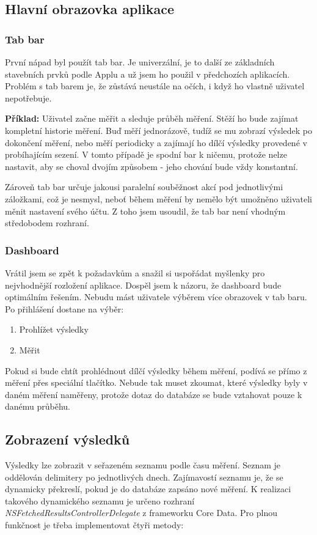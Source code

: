 \subsection*{Hlavní obrazovka aplikace}

\subsubsection*{Tab bar}
První nápad byl použít tab bar. Je univerzální, je to další ze základních stavebních prvků podle Applu a už jsem ho použil v předchozích aplikacích. Problém s tab barem je, že zůstává neustále na očích, i když ho vlastně uživatel nepotřebuje. 

{\bf Příklad:}
Uživatel začne měřit a sleduje průběh měření. Stěží ho bude zajímat kompletní historie měření. Buď měří jednorázově, tudíž se mu zobrazí výsledek po dokončení měření, nebo měří periodicky a zajímají ho dílčí výsledky provedené v probíhajícím sezení. V tomto případě je spodní bar k ničemu, protože nelze nastavit, aby se choval dvojím způsobem - jeho chování bude vždy konstantní.

Zároveň tab bar určuje jakousi paralelní souběžnost akcí pod jednotlivými záložkami, což je nesmysl, neboť během měření by nemělo být umožněno uživateli měnit nastavení svého účtu. Z toho jsem usoudil, že tab bar není vhodným středobodem rozhraní.

\subsubsection*{Dashboard}
Vrátil jsem se zpět k požadavkům a snažil si uspořádat myšlenky pro nejvhodnější rozložení aplikace. Dospěl jsem k názoru, že dashboard bude optimálním řešením. Nebudu mást uživatele výběrem více obrazovek v tab baru. Po přihlášení dostane na výběr:

\begin{enumerate}
	\item Prohlížet výsledky
	\item Měřit
\end{enumerate}

Pokud si bude chtít prohlédnout dílčí výsledky během měření, podívá se přímo z měření přes speciální tlačítko. Nebude tak muset zkoumat, které výsledky byly v daném měření naměřeny, protože dotaz do databáze se bude vztahovat pouze k danému průběhu.

\subsection*{Zobrazení výsledků}
Výsledky lze zobrazit v seřazeném seznamu podle času měření. Seznam je oddělován delimitery po jednotlivých dnech. Zajímavostí seznamu je, že se dynamicky překreslí, pokud je do databáze zapsáno nové měření. K realizaci takového dynamického seznamu je určeno rozhraní \emph{NSFetchedResultsControllerDelegate} z frameworku Core Data. Pro plnou funkčnost je třeba implementovat čtyři metody:

